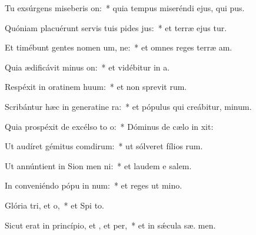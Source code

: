 \item Tu exsúrgens miseberis on:~* quia tempus miseréndi ejus, qui  pus.
\item Quóniam placuérunt servis tuis pides jus:~* et terræ ejus tur.
\item Et timébunt gentes nomen um, ne:~* et omnes reges terræ  am.
\item Quia ædificávit minus on:~* et vidébitur in  a.
\item Respéxit in oratinem huum:~* et non sprevit  rum.
\item Scribántur hæc in generatine ra:~* et pópulus qui creábitur,  minum.
\item Quia prospéxit de excélso to o:~* Dóminus de cælo in  xit:
\item Ut audíret gémitus comdirum:~* ut sólveret fílios rum.
\item Ut annúntient in Sion men ni:~* et laudem e  salem.
\item In conveniéndo pópu in num:~* et reges ut  mino.
\item Glória tri, et o,~* et Spi to.
\item Sicut erat in princípio, et , et per,~* et in sǽcula sæ. men.
